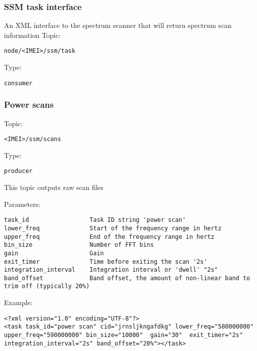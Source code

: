 \subsubsection{SSM task interface}
An XML interface to the spectrum scanner that will return  spectrum scan information
Topic:
\begin{lstlisting}node/<IMEI>/ssm/task\end{lstlisting}
Type:
\begin{lstlisting}consumer\end{lstlisting}

\subsubsection{Power scans}
Topic:
\begin{lstlisting}<IMEI>/ssm/scans\end{lstlisting}
Type:
\begin{lstlisting}producer\end{lstlisting}
    
This topic outputs raw scan files

Parameters:

\begin{lstlisting}
task_id                 Task ID string 'power scan'
lower_freq              Start of the frequency range in hertz
upper_freq              End of the frequency range in hertz
bin_size                Number of FFT bins
gain                    Gain
exit_timer              Time before exiting the scan '2s'
integration_interval    Integration interval or 'dwell' "2s"
band_offset             Band offset, the amount of non-linear band to trim off (typically 20%)
\end{lstlisting}

Example:

\lstset{language=XML}
\begin{lstlisting}
<?xml version="1.0" encoding="UTF-8"?>
<task task_id="power scan" cid="jrnsljkngafdkg" lower_freq="580000000" upper_freq="590000000" bin_size="10000"  gain="30"  exit_timer="2s" integration_interval="2s" band_offset="20%"></task>
\end{lstlisting}

